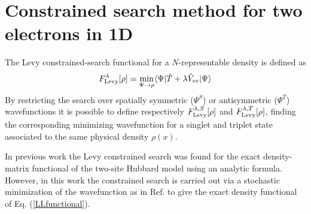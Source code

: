 \documentclass[aps,pra,twocolumn,superscriptaddress]{revtex4}
\begin{document}
\section{Constrained search method for two electrons in 1D}
\label{constrainedsearch}
The Levy constrained-search functional for a $N$-representable density is defined as \cite{Lev-PNAS-79}
\begin{equation}\label{LLfunctional}
F_{\rm{Levy}}^{\lambda}[\rho]=\min_{\Psi\rightarrow\rho}\langle\Psi\vert\hat{T}+\lambda\hat{V}_{ee}\vert\Psi\rangle
\end{equation}
By restricting the search over spatially symmetric ($\Psi^S$) or antisymmetric ($\Psi^T$) wavefunctions it is possible to define respectively $F_{\rm{Levy}}^{\lambda,S}[\rho]$ and $F_{\rm{Levy}}^{\lambda,T}[\rho]$, finding the corresponding minimizing wavefunction for a singlet and triplet state associated to the same physical density $\rho(x)$.

In previous work \cite{Cohen160142511} the Levy constrained search was found for the exact density-matrix functional of the two-site Hubbard model using an analytic formula. However, in this work the constrained search is carried out via a stochastic minimization of the wavefunction 
as in Ref. \cite{MoriCohen1DCS} to give the exact density functional of Eq. (\ref{LLfunctional}).
\end{document}
